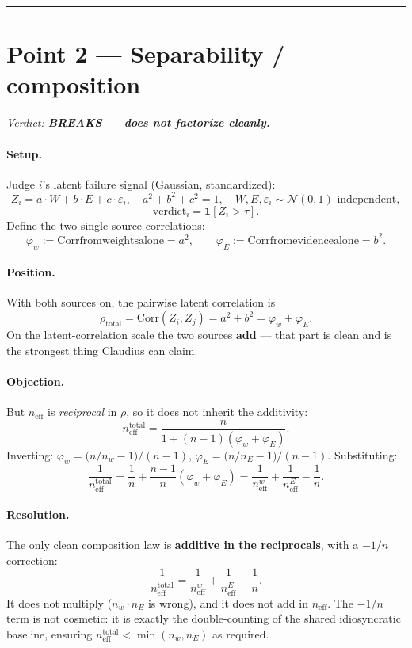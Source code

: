 \documentclass[11pt,a4paper]{article}
\begin{document}
\bigskip
\hrule
\bigskip

\section*{Point 2 --- Separability / composition}

\noindent\textit{Verdict: \textbf{BREAKS --- does not factorize cleanly.}}

\medskip

\paragraph{Setup.}
Judge $i$'s latent failure signal (Gaussian, standardized):
\[
  Z_i = a \cdot W + b \cdot E + c \cdot \varepsilon_i,
  \quad a^2+b^2+c^2=1,\quad W,E,\varepsilon_i \sim \mathcal{N}(0,1) \text{ independent},
\]
\[
  \mathrm{verdict}_i = \mathbf{1}[Z_i > \tau].
\]
Define the two single-source correlations:
\[
  \varphi_w := \mathrm{Corr from weights alone} = a^2,
  \qquad
  \varphi_E := \mathrm{Corr from evidence alone} = b^2.
\]

\paragraph{Position.}
With both sources on, the pairwise latent correlation is
\[
  \rho_{\mathrm{total}} = \mathrm{Corr}(Z_i, Z_j) = a^2 + b^2 = \varphi_w + \varphi_E.
  \tag{$\star$}
\]
On the latent-correlation scale the two sources \textbf{add} --- that part is clean and is the
strongest thing Claudius can claim.

\paragraph{Objection.}
But $n_{\mathrm{eff}}$ is \emph{reciprocal} in $\rho$, so it does not inherit the additivity:
\[
  n_{\mathrm{eff}}^{\mathrm{total}} = \frac{n}{1+(n-1)(\varphi_w + \varphi_E)}.
\]
Inverting:
$\varphi_w = \bigl(n/n_w - 1\bigr)/(n-1)$,
$\varphi_E = \bigl(n/n_E - 1\bigr)/(n-1)$.
Substituting:
\[
  \frac{1}{n_{\mathrm{eff}}^{\mathrm{total}}}
  = \frac{1}{n} + \frac{n-1}{n}(\varphi_w + \varphi_E)
  = \frac{1}{n_{\mathrm{eff}}^w} + \frac{1}{n_{\mathrm{eff}}^E} - \frac{1}{n}.
  \tag{$\dagger$}
\]

\paragraph{Resolution.}
The only clean composition law is \textbf{additive in the reciprocals}, with a $-1/n$ correction:
\[
  \boxed{\frac{1}{n_{\mathrm{eff}}^{\mathrm{total}}}
  = \frac{1}{n_{\mathrm{eff}}^w} + \frac{1}{n_{\mathrm{eff}}^E} - \frac{1}{n}.}
\]
It does not multiply ($n_w \cdot n_E$ is wrong), and it does not add in $n_{\mathrm{eff}}$.
The $-1/n$ term is not cosmetic: it is exactly the double-counting of the shared idiosyncratic
baseline, ensuring $n_{\mathrm{eff}}^{\mathrm{total}} < \min(n_w, n_E)$ as required.
\end{document}

